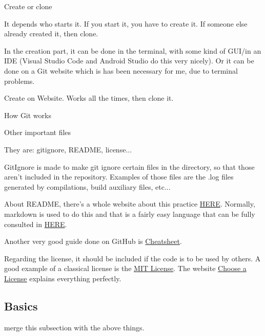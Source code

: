 {\large Create or clone}
\vspace{.5cm}
\par It depends who starts it. If you start it, you have to create it. If someone else already created it, then clone.

\par In the creation part, it can be done in the terminal, with some kind of GUI/in an IDE (Visual Studio Code and Android Studio do this very nicely). Or it can be done on a Git website which is has been necessary for me, due to terminal problems.

\par Create on Website. Works all the times, then clone it.
\vspace{.5cm}


{\large How Git works}
\vspace{.5cm}


\vspace{.5cm}

{\large Other important files}

\vspace{.5cm}
\par They are: gitignore, README, license...

\par GitIgnore is made to make git ignore certain files in the directory, so that those aren't included in the repository. Examples of those files are the .log files generated by compilations, build auxiliary files, etc...

\par About README, there's a whole website about this practice \href{https://www.makeareadme.com/}{HERE}. Normally, markdown is used to do this and that is a fairly easy language that can be fully consulted in \href{https://commonmark.org/help/}{HERE}.
\par Another very good guide done on GitHub is \href{https://github.com/adam-p/markdown-here/wiki/Markdown-Cheatsheet}{Cheatsheet}.

\par Regarding the license, it should be included if the code is to be used by others. A good example of a classical license is the \href{https://choosealicense.com/licenses/mit/}{MIT License}. The website \href{https://choosealicense.com}{Choose a License} explains everything perfectly.


\subsection{Basics}
merge this subsection with the above things.

